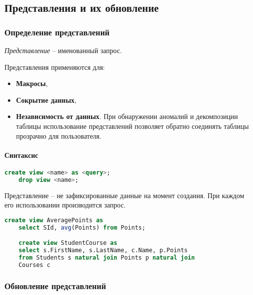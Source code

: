 \subsection{Представления и их обновление}

\subsubsection{Определение представлений}

\begin{definition}
	\textit{Представление} -- именованный запрос.
\end{definition}

Представления применяются для:

\begin{itemize}
	\item \textbf{Макросы},
	\item \textbf{Сокрытие данных},
	\item \textbf{Независимость от данных}. При обнаружении аномалий и декомпозиции таблицы
	      использование представлений позволяет обратно соединять таблицы прозрачно для пользователя.
\end{itemize}

\paragraph{Синтаксис}
\enewline

\begin{lstlisting}[language=SQL]
    create view <name> as <query>;
    drop view <name>;
\end{lstlisting}

\begin{remark}
	Представление -- не зафиксированные данные на момент создания. При каждом его использовании
	производится запрос.
\end{remark}

\begin{examples}
	\enewline
	\begin{lstlisting}[language=SQL]
    create view AveragePoints as
    select SId, avg(Points) from Points;

    create view StudentCourse as
    select s.FirstName, s.LastName, c.Name, p.Points
    from Students s natural join Points p natural join
    Courses c
    \end{lstlisting}
\end{examples}

\subsubsection{Обновление представлений}

